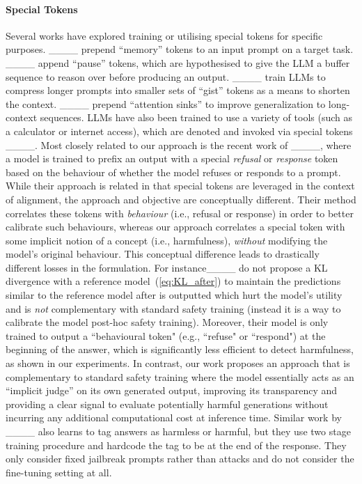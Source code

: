 \paragraph{Special Tokens} 
Several works have explored training or utilising special tokens for specific purposes.
____ prepend ``memory'' tokens to an input prompt on a target task.
____ append ``pause'' tokens, which are hypothesised to give the LLM a buffer sequence to reason over before producing an output.
____ train LLMs to compress longer prompts into smaller sets of ``gist'' tokens as a means to shorten the context. 
____ prepend ``attention sinks'' to improve generalization to long-context sequences.
LLMs have also been trained to use a variety of tools (such as a calculator or internet access), which are denoted and invoked via special tokens ____.
Most closely related to our approach is the recent work of ____, where a model is trained to prefix an output with a special \emph{refusal} or \emph{response} token based on the behaviour of whether the model refuses or responds to a prompt.
While their approach is related in that special tokens are leveraged in the context of alignment, the approach and objective are conceptually different.
Their method correlates these tokens with \textit{behaviour} (i.e., refusal or response) in order to better calibrate such behaviours, whereas our approach correlates a special token with some implicit notion of a concept (i.e., harmfulness), \textit{without} modifying the model's original behaviour. This conceptual difference leads to drastically different losses in the formulation. For instance____ do not propose a KL divergence with a reference model~(\cref{eq:KL_after}) to maintain the predictions similar to the reference model after \rftoken{} is outputted which hurt the model's utility and is \emph{not} complementary with standard safety training (instead it is a way to calibrate the model post-hoc safety training). Moreover, their model is only trained to output a ``behavioural token" (e.g., ``refuse" or ``respond") at the beginning of the answer, which is significantly less efficient to detect harmfulness, as shown in our experiments. In contrast, our work proposes an approach that is complementary to standard safety training where the model essentially acts as an ``implicit judge'' on its own generated output, improving its transparency and providing a clear signal to evaluate potentially harmful generations without incurring any additional computational cost at inference time. Similar work by ____ also learns to tag answers as harmless or harmful, but they use two stage training procedure and hardcode the tag to be at the end of the response. They only consider fixed jailbreak prompts rather than attacks and do not consider the fine-tuning setting at all.